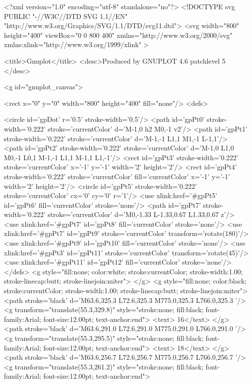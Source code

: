 <?xml version="1.0" encoding="utf-8"  standalone="no"?>
<!DOCTYPE svg PUBLIC "-//W3C//DTD SVG 1.1//EN" 
 "http://www.w3.org/Graphics/SVG/1.1/DTD/svg11.dtd">
<svg 
 width="800" height="400" 
 viewBox="0 0 800 400"
 xmlns="http://www.w3.org/2000/svg"
 xmlns:xlink="http://www.w3.org/1999/xlink"
>

<title>Gnuplot</title>
<desc>Produced by GNUPLOT 4.6 patchlevel 5 </desc>

<g id="gnuplot_canvas">

<rect x="0" y="0" width="800" height="400" fill="none"/>
<defs>

	<circle id='gpDot' r='0.5' stroke-width='0.5'/>
	<path id='gpPt0' stroke-width='0.222' stroke='currentColor' d='M-1,0 h2 M0,-1 v2'/>
	<path id='gpPt1' stroke-width='0.222' stroke='currentColor' d='M-1,-1 L1,1 M1,-1 L-1,1'/>
	<path id='gpPt2' stroke-width='0.222' stroke='currentColor' d='M-1,0 L1,0 M0,-1 L0,1 M-1,-1 L1,1 M-1,1 L1,-1'/>
	<rect id='gpPt3' stroke-width='0.222' stroke='currentColor' x='-1' y='-1' width='2' height='2'/>
	<rect id='gpPt4' stroke-width='0.222' stroke='currentColor' fill='currentColor' x='-1' y='-1' width='2' height='2'/>
	<circle id='gpPt5' stroke-width='0.222' stroke='currentColor' cx='0' cy='0' r='1'/>
	<use xlink:href='#gpPt5' id='gpPt6' fill='currentColor' stroke='none'/>
	<path id='gpPt7' stroke-width='0.222' stroke='currentColor' d='M0,-1.33 L-1.33,0.67 L1.33,0.67 z'/>
	<use xlink:href='#gpPt7' id='gpPt8' fill='currentColor' stroke='none'/>
	<use xlink:href='#gpPt7' id='gpPt9' stroke='currentColor' transform='rotate(180)'/>
	<use xlink:href='#gpPt9' id='gpPt10' fill='currentColor' stroke='none'/>
	<use xlink:href='#gpPt3' id='gpPt11' stroke='currentColor' transform='rotate(45)'/>
	<use xlink:href='#gpPt11' id='gpPt12' fill='currentColor' stroke='none'/>
</defs>
<g style="fill:none; color:white; stroke:currentColor; stroke-width:1.00; stroke-linecap:butt; stroke-linejoin:miter">
</g>
<g style="fill:none; color:black; stroke:currentColor; stroke-width:1.00; stroke-linecap:butt; stroke-linejoin:miter">
	<path stroke='black'  d='M63.6,325.3 L72.6,325.3 M775.0,325.3 L766.0,325.3  '/>	<g transform="translate(55.3,329.8)" style="stroke:none; fill:black; font-family:Arial; font-size:12.00pt; text-anchor:end">
		<text> 16</text>
	</g>
	<path stroke='black'  d='M63.6,291.0 L72.6,291.0 M775.0,291.0 L766.0,291.0  '/>	<g transform="translate(55.3,295.5)" style="stroke:none; fill:black; font-family:Arial; font-size:12.00pt; text-anchor:end">
		<text> 18</text>
	</g>
	<path stroke='black'  d='M63.6,256.7 L72.6,256.7 M775.0,256.7 L766.0,256.7  '/>	<g transform="translate(55.3,261.2)" style="stroke:none; fill:black; font-family:Arial; font-size:12.00pt; text-anchor:end">
